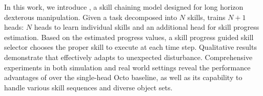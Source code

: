 In this work, we introduce \ours, a skill chaining model designed for long horizon dexterous manipulation. 
Given a task decomposed into $N$ skills, \ours trains $N+1$ heads: $N$ heads to learn individual skills and an additional head for skill progress estimation. 
Based on the estimated progress values, a skill progress guided skill selector \progss chooses the proper skill to execute at each time step. 
Qualitative results demonstrate that \progss effectively adapts to unexpected disturbance.
Comprehensive experiments in both simulation and real world settings reveal the performance advantages of \ours over the single-head Octo baseline, as well as its capability to handle various skill sequences and diverse object sets.


